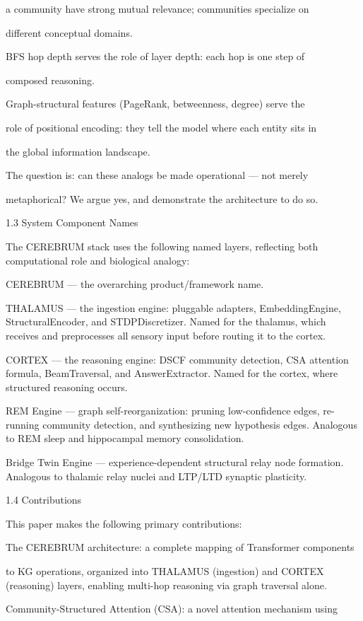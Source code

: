 \documentclass[10pt,journal,compsoc]{IEEEtran}
\begin{document}
a community have strong mutual relevance; communities specialize on

different conceptual domains.

BFS hop depth serves the role of layer depth: each hop is one step of

composed reasoning.

Graph-structural features (PageRank, betweenness, degree) serve the

role of positional encoding: they tell the model where each entity sits in

the global information landscape.

The question is: can these analogs be made operational — not merely

metap\-horical? We argue yes, and demonstrate the archi\-tecture to do so.

1.3 System Component Names

The CEREBRUM stack uses the following named layers, reflecting both compu\-tational role and biological analogy:

CEREBRUM — the overarching product/framework name.

THALAMUS — the ingestion engine: pluggable adapters, EmbeddingEngine, StructuralEncoder, and STDPDiscre\-tizer. Named for the thalamus, which receives and prepr\-ocesses all sensory input before routing it to the cortex.

CORTEX — the reasoning engine: DSCF community detection, CSA attention formula, BeamTraversal, and AnswerExtractor. Named for the cortex, where structured reasoning occurs.

REM Engine — graph self-reorg\-anization: pruning low-confidence edges, re-running community detection, and synth\-esizing new hypothesis edges. Analogous to REM sleep and hippocampal memory conso\-lidation.

Bridge Twin Engine — experience-dependent structural relay node formation. Analogous to thalamic relay nuclei and LTP/LTD synaptic plasticity.

1.4 Contri\-butions

This paper makes the following primary contr\-ibutions:

The CEREBRUM archi\-tecture: a complete mapping of Transformer components

to KG operations, organized into THALAMUS (ingestion) and CORTEX (reasoning) layers, enabling multi-hop reasoning via graph traversal alone.

Community-Structured Attention (CSA): a novel attention mechanism using
\end{document}
